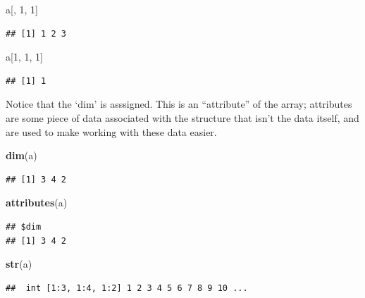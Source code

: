 \documentclass[]{article}
\newenvironment{Shaded}{\begin{snugshade}}{\end{snugshade}}
\newcommand{\KeywordTok}[1]{\textcolor[rgb]{0.13,0.29,0.53}{\textbf{#1}}}
\newcommand{\DecValTok}[1]{\textcolor[rgb]{0.00,0.00,0.81}{#1}}
\newcommand{\NormalTok}[1]{#1}
\begin{document}
\begin{Shaded}
\begin{Highlighting}[]
\NormalTok{a[, }\DecValTok{1}\NormalTok{, }\DecValTok{1}\NormalTok{]}
\end{Highlighting}
\end{Shaded}

\begin{verbatim}
## [1] 1 2 3
\end{verbatim}

\begin{Shaded}
\begin{Highlighting}[]
\NormalTok{a[}\DecValTok{1}\NormalTok{, }\DecValTok{1}\NormalTok{, }\DecValTok{1}\NormalTok{]}
\end{Highlighting}
\end{Shaded}

\begin{verbatim}
## [1] 1
\end{verbatim}

Notice that the `dim' is asssigned. This is an ``attribute'' of the
array; attributes are some piece of data associated with the structure
that isn't the data itself, and are used to make working with these data
easier.

\begin{Shaded}
\begin{Highlighting}[]
\KeywordTok{dim}\NormalTok{(a) }
\end{Highlighting}
\end{Shaded}

\begin{verbatim}
## [1] 3 4 2
\end{verbatim}

\begin{Shaded}
\begin{Highlighting}[]
\KeywordTok{attributes}\NormalTok{(a)}
\end{Highlighting}
\end{Shaded}

\begin{verbatim}
## $dim
## [1] 3 4 2
\end{verbatim}

\begin{Shaded}
\begin{Highlighting}[]
\KeywordTok{str}\NormalTok{(a)}
\end{Highlighting}
\end{Shaded}

\begin{verbatim}
##  int [1:3, 1:4, 1:2] 1 2 3 4 5 6 7 8 9 10 ...
\end{verbatim}
\end{document}
